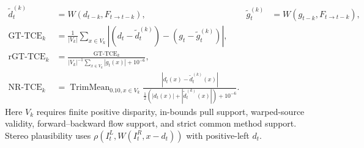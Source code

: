 \begin{align}
\tilde d_t^{(k)}&=W(d_{t-k},F_{t\to t-k}),&\tilde g_t^{(k)}&=W(g_{t-k},F_{t\to t-k}),\\
\mathrm{GT\text{-}TCE}_k&=\frac{1}{|V_k|}\sum_{x\in V_k}\left|(d_t-\tilde d_t^{(k)})-(g_t-\tilde g_t^{(k)})\right|,\\
\mathrm{rGT\text{-}TCE}_k&=\frac{\mathrm{GT\text{-}TCE}_k}{|V_k|^{-1}\sum_{x\in V_k}|g_t(x)|+10^{-6}},\\
\mathrm{NR\text{-}TCE}_k&=\operatorname{TrimMean}_{0.10,x\in V_k}\frac{|d_t(x)-\tilde d_t^{(k)}(x)|}{\tfrac12(|d_t(x)|+|\tilde d_t^{(k)}(x)|)+10^{-6}}.
\end{align}
Here $V_k$ requires finite positive disparity, in-bounds pull support, warped-source validity, forward--backward flow support, and strict common method support. Stereo plausibility uses $\rho(I_t^L,W(I_t^R,x-d_t))$ with positive-left $d_t$.
